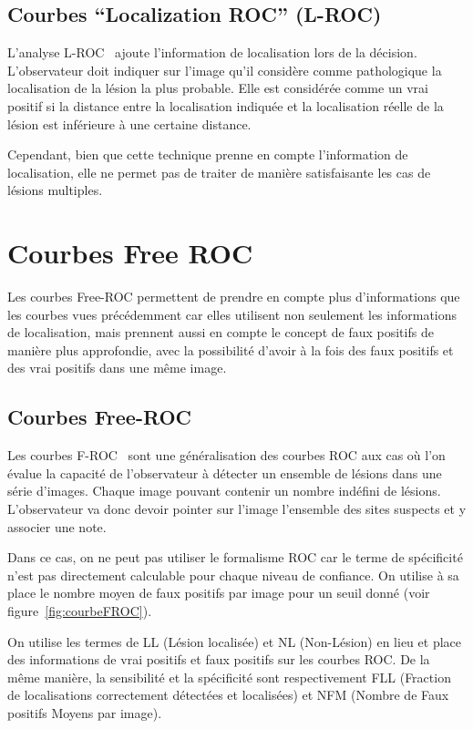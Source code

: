 \subsection{Courbes ``Localization ROC'' (L-ROC)}

L'analyse L-ROC~\cite{farquhar1999roc} ajoute l'information de localisation lors de la décision. L'observateur doit indiquer sur l'image qu'il considère comme pathologique la localisation de la lésion la plus probable. Elle est considérée comme un vrai positif si la distance entre la localisation indiquée et la localisation réelle de la lésion est inférieure à une certaine distance.

Cependant, bien que cette technique prenne en compte l'information de localisation, elle ne permet pas de traiter de manière satisfaisante les cas de lésions multiples.


\section{Courbes Free ROC}	

Les courbes Free-ROC permettent de prendre en compte plus d'informations que les courbes vues précédemment car elles utilisent non seulement les informations de localisation, mais prennent aussi en compte le concept de faux positifs de manière plus approfondie, avec la possibilité d'avoir à la fois des faux positifs et des vrai positifs dans une même image.



\subsection{Courbes Free-ROC}
\label{lab:FROC}

Les courbes F-ROC~\cite{bunch1978free} sont une généralisation des courbes ROC aux cas où l'on évalue la capacité de l'observateur à détecter un ensemble de lésions dans une série d'images. Chaque image pouvant contenir un nombre indéfini de lésions. L'observateur va donc devoir pointer sur l'image l'ensemble des sites suspects et y associer une note.

Dans ce cas, on ne peut pas utiliser le formalisme ROC car le terme de spécificité n'est pas directement calculable pour chaque niveau de confiance. On utilise à sa place le nombre moyen de faux positifs par image pour un seuil donné (voir figure~\ref{fig:courbeFROC}).

On utilise les termes de LL (Lésion localisée) et NL (Non-Lésion) en lieu et place des informations de vrai positifs et faux positifs sur les courbes ROC. De la même manière, la sensibilité et la spécificité sont respectivement FLL (Fraction de localisations correctement détectées et localisées) et NFM (Nombre de Faux positifs Moyens par image).



